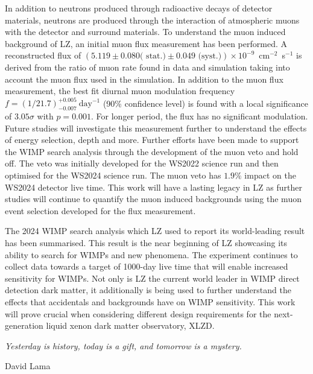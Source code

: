 In addition to neutrons produced through radioactive decays of detector materials, neutrons are produced through the interaction of atmospheric muons with the detector and surround materials. To understand the muon induced background of LZ, an initial muon flux measurement has been performed. A reconstructed flux of $(5.119 \pm 0.080 \textrm{( stat.)} \pm 0.049 \textrm{ (syst.)})\times10^{-9}$~cm$^{-2}$~s$^{-1}$ is derived from the ratio of muon rate found in data and simulation taking into account the muon flux used in the simulation. In addition to the muon flux measurement, the best fit diurnal muon modulation frequency $f=(1/21.7)^{+0.005}_{-0.007}~\text{day}^{-1}$ (90\% confidence level) is found with a local significance of $3.05\sigma$ with $p=0.001$. For longer period, the flux has no significant modulation. Future studies will investigate this measurement further to understand the effects of energy selection, depth and more.
Further efforts have been made to support the WIMP search analysis through the development of the muon veto and hold off. The veto was initially developed for the WS2022 science run and then optimised for the WS2024 science run. The muon veto has $1.9\%$ impact on the WS2024 detector live time. This work will have a lasting legacy in LZ as further studies will continue to quantify the muon induced backgrounds using the muon event selection developed for the flux measurement.

The 2024 WIMP search analysis which LZ used to report its world-leading result has been summarised. This result is the near beginning of LZ showcasing its ability to search for WIMPs and new phenomena. The experiment continues to collect data towards a target of 1000-day live time that will enable increased sensitivity for WIMPs. Not only is LZ the current world leader in WIMP direct detection dark matter, it additionally is being used to further understand the effects that accidentals and backgrounds have on WIMP sensitivity. This work will prove crucial when considering different design requirements for the next-generation liquid xenon dark matter observatory, XLZD.

\begin{flushright}
\textit{Yesterday is history, today is a gift, and tomorrow is a mystery.}

David Lama
\end{flushright}